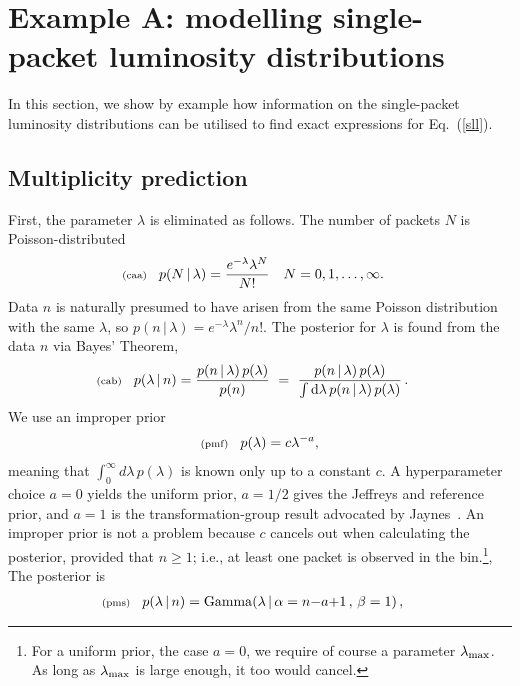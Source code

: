 \documentclass[11pt]{article}
\newcommand{\lleq}[1]{\label{#1} }
\renewcommand{\lleq}[1]{\label{#1} {\scriptstyle {\rm (#1)}} \hspace*{2ex} }
\newcommand{\cond}{\,|\,}
\DeclareMathOperator{\GammaDist}{Gamma}
\newcommand{\rmdx}[1]{\dd{#1}} %
\begin{document}
\section{Example A: modelling single-packet luminosity distributions} 
\label{sec:example}

In this section, we show by example how information on the
single-packet luminosity distributions can be utilised to find exact
expressions for Eq.~(\ref{sll}). 

\subsection{Multiplicity prediction}

First, the parameter $\lambda$ is eliminated as follows. The number of
packets $N$ is Poisson-distributed
\begin{align}
  \lleq{caa}
  p(N\cond\lambda) &= \frac{e^{-\lambda}\lambda^{N}}{N!}
  \quad N = 0,1,\ldots,\infty.
\end{align}
Data $n$ is naturally presumed to have arisen from the same Poisson
distribution with the same $\lambda$, so $p(n\cond\lambda) =
e^{-\lambda}\lambda^{n}/n!$. %
The posterior for $\lambda$ is found from the data $n$ via Bayes'
Theorem,
\begin{align}
  \lleq{cab}
  p(\lambda\cond n) %
  &= \frac{p(n\cond\lambda)\,p(\lambda)} {p(n)}
  \ =\ \frac{p(n\cond\lambda)\,p(\lambda)} %
  {\int \rmdx{\lambda} p(n\cond\lambda)\,p(\lambda)} \,.
\end{align}
We use an improper prior 
\begin{align}
  \lleq{pmf}
  p(\lambda) = c \lambda^{-a},
\end{align}
meaning that $\int_0^\infty d\lambda\,p(\lambda)$ is known only up to
a constant $c$. A hyperparameter choice $a=0$ yields the uniform
prior, $a=1/2$ gives the Jeffreys and reference prior, and $a=1$ is
the transformation-group result advocated by
Jaynes~\cite[Ch. 12]{jaynes2003probability}. An improper prior is not
a problem because $c$ cancels out when calculating the posterior,
provided that $n \ge 1$; i.e., at least one packet is observed in the
bin.\footnote{For a uniform prior, the case $a{=}0$, we require of
  course a parameter $\lambda_{\rm max}$. As long as
  $\lambda_{\rm max}$ is large enough, it too would cancel.}, The
posterior is
\begin{align}
  \lleq{pms}
  p(\lambda\cond n) 
  &= \GammaDist(\lambda \cond \alpha = n{-}a{+}1 \,,\, \beta = 1)\,,
\end{align}
\end{document}
